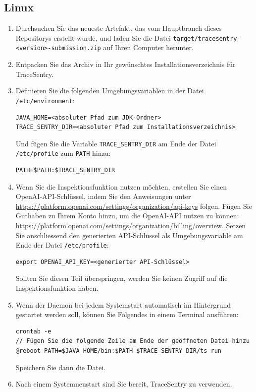 \documentclass[a4paper,12pt]{report}
\begin{document}
    \subsection{Linux}\label{subsec:linux}
    \begin{enumerate}
        \item Durchsuchen Sie das neueste Artefakt, das vom Hauptbranch dieses Repositorys erstellt wurde, und laden Sie die Datei
        \texttt{target/tracesentry-\textless{}version\textgreater{}-submission.zip} auf Ihren Computer herunter.
        \item Entpacken Sie das Archiv in Ihr gewünschtes Installationsverzeichnis für TraceSentry.
        \item Definieren Sie die folgenden Umgebungsvariablen in der Datei \texttt{/etc/environment}:
        \begin{lstlisting}[label={lst:lstlisting-unix-1}]
JAVA_HOME=<absoluter Pfad zum JDK-Ordner>
TRACE_SENTRY_DIR=<absoluter Pfad zum Installationsverzeichnis>
        \end{lstlisting}
        Und fügen Sie die Variable \texttt{TRACE\_SENTRY\_DIR} am Ende der Datei \texttt{/etc/profile} zum \texttt{PATH} hinzu:
        \begin{lstlisting}[label={lst:lstlisting-unix-2}]
PATH=$PATH:$TRACE_SENTRY_DIR
        \end{lstlisting}
        \item Wenn Sie die Inspektionsfunktion nutzen möchten, erstellen Sie einen OpenAI-API-Schlüssel, indem Sie den Anweisungen unter \url{https://platform.openai.com/settings/organization/api-keys} folgen.
        Fügen Sie Guthaben zu Ihrem Konto hinzu, um die OpenAI-API nutzen zu können: \url{https://platform.openai.com/settings/organization/billing/overview}.
        Setzen Sie anschliessend den generierten API-Schlüssel als Umgebungsvariable am Ende der Datei \texttt{/etc/profile}:
        \begin{lstlisting}[label={lst:lstlisting-unix-3}]
export OPENAI_API_KEY=<generierter API-Schlüssel>
        \end{lstlisting}
        Sollten Sie diesen Teil überspringen, werden Sie keinen Zugriff auf die Inspektionsfunktion haben.
        \item Wenn der Daemon bei jedem Systemstart automatisch im Hintergrund gestartet werden soll, können Sie Folgendes in einem Terminal ausführen:
        \begin{lstlisting}[label={lst:lstlisting-unix-4}]
crontab -e
// Fügen Sie die folgende Zeile am Ende der geöffneten Datei hinzu
@reboot PATH=$JAVA_HOME/bin:$PATH $TRACE_SENTRY_DIR/ts run
        \end{lstlisting}
        Speichern Sie dann die Datei.
        \item Nach einem Systemneustart sind Sie bereit, TraceSentry zu verwenden.
    \end{enumerate}
\end{document}
